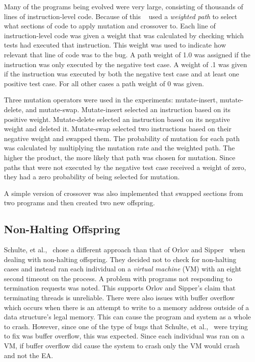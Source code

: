 \documentclass{sig-alternate}
\begin{document}
Many of the programs being evolved were very large, consisting of thousands of lines of instruction-level code. Because of this ~\cite{Assembly:2010} used a \textit{weighted path} to select what sections of code to apply mutation and crossover to. Each line of instruction-level code was given a weight that was calculated by checking which tests had executed that instruction. This weight was used to indicate how relevant that line of code was to the bug. A path weight of 1.0 was assigned if the instruction was only executed by the negative test case. A weight of .1 was given if the instruction was executed by both the negative test case and at least one positive test case. For all other cases a path weight of 0 was given.

Three mutation operators were used in the experiments: mutate-insert, mutate-delete, and mutate-swap. Mutate-insert selected an instruction based on its positive weight. Mutate-delete selected an instruction based on its negative weight and deleted it. Mutate-swap selected two instructions based on their negative weight and swapped them. The probability of mutation for each path was calculated by multiplying the mutation rate and the weighted path. The higher the product, the more likely that path was chosen for mutation. Since paths that were not executed by the negative test case received a weight of zero, they had a zero probability of being selected for mutation.\par

A simple version of crossover was also implemented that swapped sections from two programs and then created two new offspring.

\subsection{Non-Halting Offspring}

Schulte, et al.,~\cite{Assembly:2010} chose a different approach than that of Orlov and Sipper~\cite{FINCH:2011} when dealing with non-halting offspring. They decided not to check for non-halting cases and instead ran each individual on a \textit{virtual machine} (VM) with an eight second timeout on the process. A problem with programs not responding to termination requests was noted. This supports Orlov and Sipper's claim that terminating threads is unreliable. There were also issues with buffer overflow which occurs when there is an attempt to write to a memory address outside of a data structure's legal memory. This can cause the program and system as a whole to crash. However, since one of the type of bugs that Schulte, et al.,~\cite{Assembly:2010} were trying to fix was buffer overflow, this was expected. Since each individual was ran on a VM, if buffer overflow did cause the system to crash only the VM would crash and not the EA.
\end{document}
